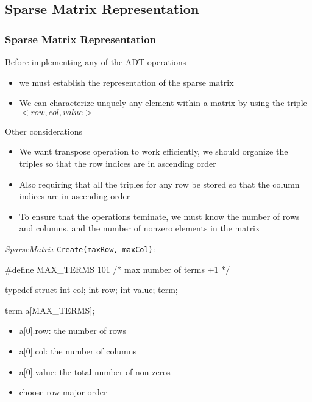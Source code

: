 \documentclass[newPxFont,sthlmFooter,nooffset]{beamer}
\begin{document}
\subsection{Sparse Matrix Representation}

\begin{frame}
  \frametitle{Sparse Matrix Representation}
Before implementing any of the ADT operations
\begin{itemize}
  \item we must establish the representation of the sparse matrix
  \item We can characterize unquely any element within a matrix by using the triple $<row, col, value>$
\end{itemize}

Other considerations
\begin{itemize}
  \item We want transpose operation to work efficiently, we should organize the triples so that the row indices are in ascending order
  \item Also requiring that all the triples for any row be stored so that the column indices are in ascending order
  \item To ensure that the operations teminate, we must know the number of rows and columns, and the number of nonzero elements in the matrix
\end{itemize}


\framebreak

\textit{SparseMatrix} \texttt{Create(maxRow, maxCol)}:

\begin{codedef}
#define MAX_TERMS 101  /* max number of terms +1 */

typedef struct {
    int col; 
    int row; 
    int value;
} term;

term a[MAX_TERMS];  
\end{codedef}

\begin{itemize}
\item a[0].row: the number of rows
\item a[0].col: the number of columns
\item a[0].value: the total number of non-zeros
\item choose row-major order
\end{itemize}

\framebreak


\end{frame}
\end{document}
